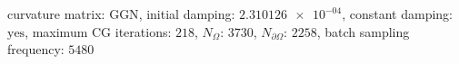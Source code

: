 curvature matrix: $\text{GGN}$, initial damping: $\num[scientific-notation=true]{2.310126e-04}$, constant damping: $\text{yes}$, maximum CG iterations: $\num[scientific-notation=false]{218}$, $N_{\Omega}$: $\num[scientific-notation=false]{3730}$, $N_{\partial\Omega}$: $\num[scientific-notation=false]{2258}$, batch sampling frequency: $\num[scientific-notation=false]{5480}$